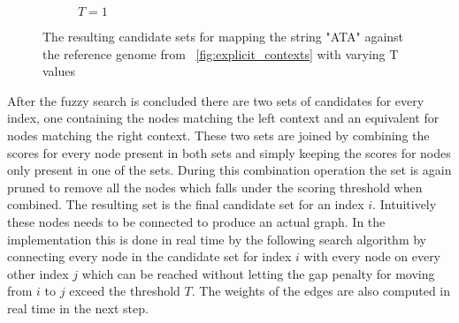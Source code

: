 \documentclass{article}
\begin{document}
\begin{wrapfigure}{r}{0.5\textwidth}
\begin{subfigure}[t]{\textwidth}
\begin{mdframed}
		\end{mdframed}
		\caption{$T=1$}
	\end{subfigure}
	\caption{The resulting candidate sets for mapping the string "ATA" against the reference genome from ~\ref{fig:explicit_contexts} with varying T values}
	\label{fig:candidate_nodes}
\end{wrapfigure}
After the fuzzy search is concluded there are two sets of candidates for every index, one containing the nodes matching the left context and an equivalent for nodes matching the right context. These two sets are joined by combining the scores for every node present in both sets and simply keeping the scores for nodes only present in one of the sets. During this combination operation the set is again pruned to remove all the nodes which falls under the scoring threshold when combined. The resulting set is the final candidate set for an index $i$. Intuitively these nodes needs to be connected to produce an actual graph. In the implementation this is done in real time by the following search algorithm by connecting every node in the candidate set for index $i$ with every node on every other index $j$ which can be reached without letting the gap penalty for moving from $i$ to $j$ exceed the threshold $T$. The weights of the edges are also computed in real time in the next step.\\
\end{document}
